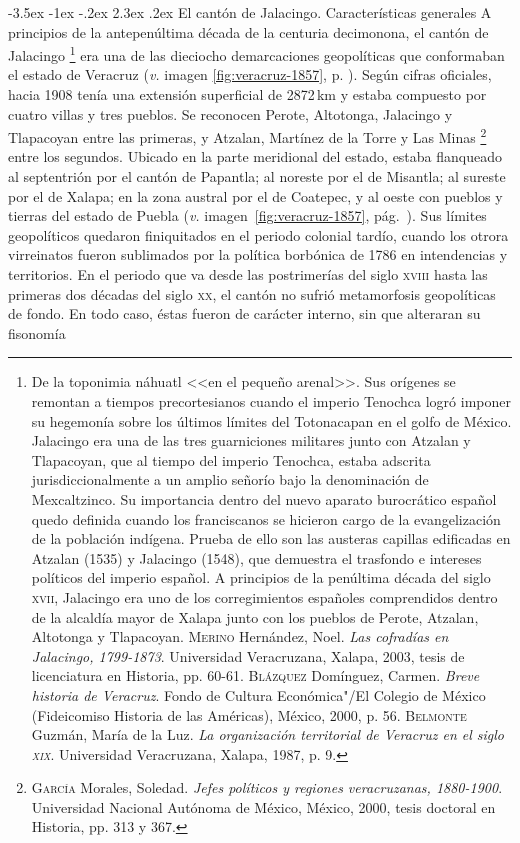 \documentclass[14pt,twoside,final]{extbook} %
\makeatletter
\let\oldfootnote\footnote
\renewcommand\footnote[1]{%
\oldfootnote{\hspace{1mm}#1}}
\renewcommand\section{\@startsection {section}{1}{\z@}%
                                     {-3.5ex \@plus -1ex \@minus -.2ex}%
                                     {2.3ex \@plus .2ex}%
                                     {\normalfont\large\bfseries\sc}}
\makeatother
\begin{document}
\section{El cantón de Jalacingo. Características generales}\label{sec:canton-caracteristicas-generales}
A principios de la antepenúltima década de la centuria decimonona, el cantón de Jalacingo\footnote{De la toponimia náhuatl <<en el pequeño arenal>>. Sus orígenes se remontan a tiempos precortesianos cuando el imperio Tenochca logró imponer su hegemonía sobre los últimos límites del Totonacapan en el golfo de México. Jalacingo era una de las tres guarniciones militares junto con Atzalan y Tlapacoyan, que al tiempo del imperio Tenochca, estaba adscrita jurisdiccionalmente a un amplio señorío bajo la denominación de Mexcaltzinco. Su importancia dentro del nuevo aparato burocrático español quedo definida cuando los franciscanos se hicieron cargo de la evangelización de la población indígena. Prueba de ello son las austeras capillas edificadas en Atzalan (1535) y Jalacingo (1548), que demuestra el trasfondo e intereses políticos del imperio español. A principios de la penúltima década del siglo \textsc{xvii}, Jalacingo era uno de los corregimientos españoles comprendidos dentro de la alcaldía mayor de Xalapa junto con los pueblos de Perote, Atzalan, Altotonga y Tlapacoyan. \textsc{Merino} Hernández, Noel. \emph{Las cofradías en Jalacingo, 1799-1873}. Universidad Veracruzana, Xalapa, 2003, tesis de licenciatura en Historia, pp. 60-61. \textsc{Blázquez} Domínguez, Carmen. \emph{Breve historia de Veracruz}. Fondo de Cultura Económica"/El Colegio de México (Fideicomiso Historia de las Américas), México, 2000, p. 56. \textsc{Belmonte} Guzmán, María de la Luz. \emph{La organización territorial de Veracruz en el siglo \textsc{xix}}. Universidad Veracruzana, Xalapa, 1987, p. 9.} era una de las dieciocho demarcaciones geopolíticas que conformaban el estado de Veracruz (\emph{v.} imagen \ref{fig:veracruz-1857}, p. \pageref{fig:veracruz-1857}). Según cifras oficiales, hacia 1908 tenía una extensión superficial de 2872\,km y estaba compuesto por cuatro villas y tres pueblos. Se reconocen Perote, Altotonga, Jalacingo y Tlapacoyan entre las primeras, y Atzalan, Martínez de la Torre y Las Minas\footnote{\textsc{García} Morales, Soledad. \emph{Jefes políticos y regiones veracruzanas, 1880-1900}. Universidad Nacional Autónoma de México, México, 2000, tesis doctoral en Historia, pp. 313 y 367.} entre los segundos. Ubicado en la parte meridional del estado, estaba flanqueado al septentrión por el cantón de Papantla; al noreste por el de Misantla; al sureste por el de Xalapa; en la zona austral por el de Coatepec, y al oeste con pueblos y tierras del estado de Puebla (\emph{v.} imagen~\ref{fig:veracruz-1857}, pág.~\pageref{fig:veracruz-1857}). Sus límites geopolíticos quedaron finiquitados en el periodo colonial tardío, cuando los otrora virreinatos fueron sublimados por la política borbónica de 1786 en intendencias y territorios. En el periodo que va desde las postrimerías del siglo \textsc{xviii} hasta las primeras dos décadas del siglo \textsc{xx}, el cantón no sufrió metamorfosis geopolíticas de fondo. En todo caso, éstas fueron de carácter interno, sin que alteraran su fisonomía 
\end{document}
